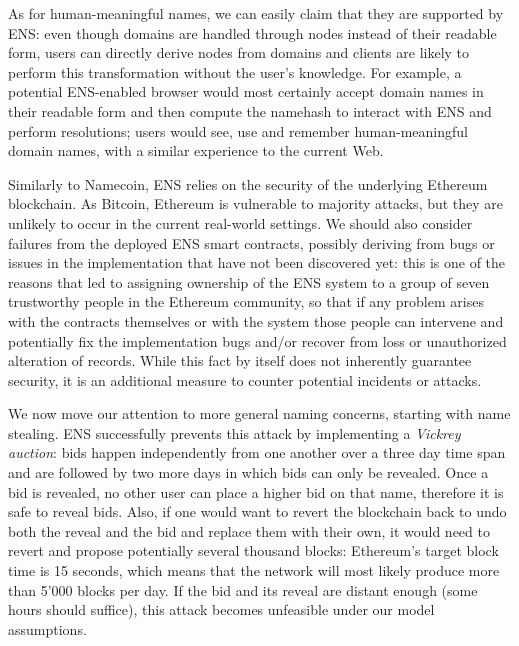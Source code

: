\documentclass[mscthesis]{usiinfthesis}
\begin{document}
As for human-meaningful names, we can easily claim that they are supported by ENS: even though domains are handled through nodes instead of their readable form, users can directly derive nodes from domains and clients are likely to perform this transformation without the user's knowledge. For example, a potential ENS-enabled browser would most certainly accept domain names in their readable form and then compute the namehash to interact with ENS and perform resolutions; users would see, use and remember human-meaningful domain names, with a similar experience to the current Web.

Similarly to Namecoin, ENS relies on the security of the underlying Ethereum blockchain. As Bitcoin, Ethereum is vulnerable to majority attacks, but they are unlikely to occur in the current real-world settings.
We should also consider failures from the deployed ENS smart contracts, possibly deriving from bugs or issues in the implementation that have not been discovered yet: this is one of the reasons that led to assigning ownership of the ENS system to a group of seven trustworthy people in the Ethereum community, so that if any problem arises with the contracts themselves or with the system those people can intervene and potentially fix the implementation bugs and/or recover from loss or unauthorized alteration of records. While this fact by itself does not inherently guarantee security, it is an additional measure to counter potential incidents or attacks.

We now move our attention to more general naming concerns, starting with name stealing. ENS successfully prevents this attack by implementing a \emph{Vickrey auction}: bids happen independently from one another over a three day time span and are followed by two more days in which bids can only be revealed. Once a bid is revealed, no other user can place a higher bid on that name, therefore it is safe to reveal bids. Also, if one would want to revert the blockchain back to undo both the reveal and the bid and replace them with their own, it would need to revert and propose potentially several thousand blocks: Ethereum's target block time is 15 seconds, which means that the network will most likely produce more than 5'000 blocks per day. If the bid and its reveal are distant enough (some hours should suffice), this attack becomes unfeasible under our model assumptions.
\end{document}
